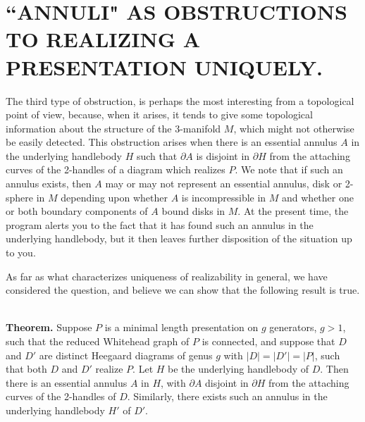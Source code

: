\documentclass[12pt]{amsart}
\newcommand{\theorem}{\ \\ \noindent  \textbf{Theorem.} }
\begin{document}
                                
        \section{``ANNULI" AS OBSTRUCTIONS TO REALIZING A PRESENTATION UNIQUELY.}
        
        
                The third type of obstruction, is perhaps the most interesting from a topological
        point of view, because, when it arises, it tends to give some topological information
        about the structure of the 3-manifold $M$, which might not otherwise be easily detected.
                This obstruction arises when there is an essential annulus $A$ in the underlying
        handlebody $H$ such that $\partial A$ is disjoint in $\partial H$ from the attaching curves of the 2-handles
        of a diagram which realizes $P$. We note that if such an annulus exists, then $A$ may or
        may not represent an essential annulus, disk or 2-sphere in $M$ depending upon whether
        $A$ is incompressible in $M$ and whether one or both boundary components of $A$ bound disks
        in $M$.
                At the present time, the program alerts you to the fact that it has found such an
        annulus in the underlying handlebody, but it then leaves further disposition of the
        situation up to you.                    


                As far as what characterizes uniqueness of realizability in general, we have
        considered the question, and believe we can show that the following result is true.
        
        \theorem        Suppose $P$ is a minimal length presentation on $g$ generators, $g > 1$, such
        that the reduced Whitehead graph of $P$ is connected, and suppose that $D$ and $D'$ are
        distinct Heegaard diagrams of genus $g$ with $|D| = |D'| = |P|$, such that both $D$ and $D'$
        realize $P$. Let $H$ be the underlying handlebody of $D$. Then there is an essential annulus
        $A$ in $H$, with $\partial A$ disjoint in $\partial H$ from the attaching curves of the 2-handles of $D$.
        Similarly, there exists such an annulus in the underlying handlebody $H'$ of $D'$.
        
\end{document}
